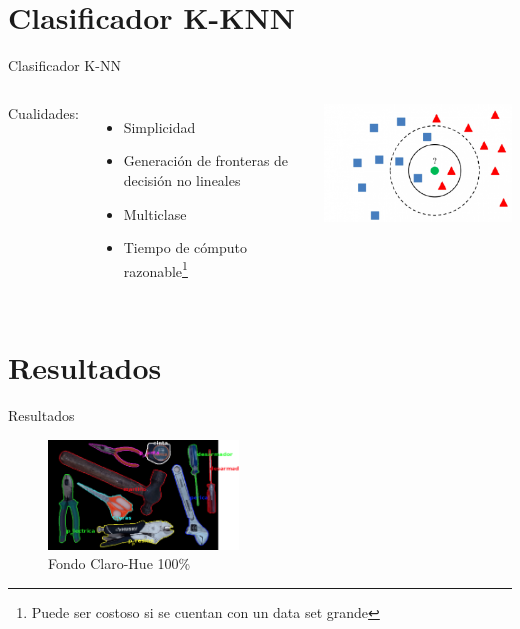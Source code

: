 \documentclass[
  24pt, %
]{beamer}
\begin{document}
\section{Clasificador K-KNN}
\begin{frame}{Clasificador K-NN}
  \begin{columns}
    Cualidades:
    
    \begin{itemize}
      \pause
    \item Simplicidad
      \pause
    \item Generación de fronteras de decisión no lineales
      \pause
    \item Multiclase
      \pause
    \item Tiempo de cómputo razonable\footnote{Puede ser costoso si se cuentan con un data set grande}
    \end{itemize}
    \includegraphics[width=\textwidth]{knn}
    
  \end{columns}
\end{frame}

\section{Resultados}
\begin{frame}{Resultados}
  \begin{figure}[h]
  \centering
  \includegraphics[width=0.45\textwidth,height=0.35\textheight]{resultados_colores/resultado_claro_hue_1}
  \caption{Fondo Claro-Hue 100\%}
  \end{figure}
\end{frame}
\end{document}
